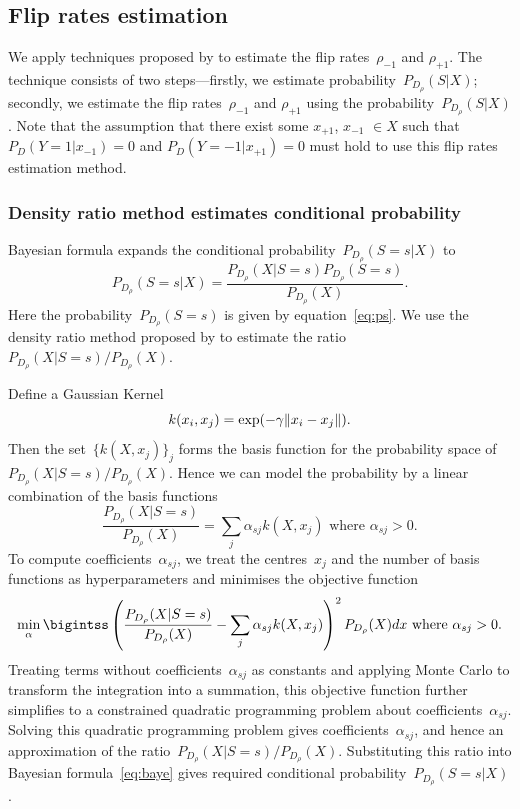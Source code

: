 \documentclass[12pt]{article} %
\DeclarePairedDelimiter{\norm}{\lVert}{\rVert}
\newcommand{\rhoo}{\rho_{+1}}
\newcommand{\rhoz}{\rho_{-1}}
\begin{document}
\subsection{Flip rates estimation}\label{method2}
We apply techniques proposed by \citet{liu2016classification} to estimate the flip rates~$\rhoz$ and $\rhoo$. The technique consists of two steps---firstly, we estimate probability~$P_{D_\rho}(S|X)$; secondly, we estimate the flip rates~$\rhoz$ and $\rhoo$ using the probability~$P_{D_\rho}(S|X)$. 
{\color{red} Note that the assumption that there exist some $x_{+1}$, $x_{-1}$ $\in X$ such that $P_{D}(Y=1|x_{-1})=0$ and $P_{D}(Y=-1|x_{+1})=0$ must hold to use this flip rates estimation method.}



\subsubsection{Density ratio method estimates conditional probability}\label{method22}
Bayesian formula expands the conditional probability~$P_{D_\rho}(S=s|X)$ to
\begin{equation}
   P_{D_\rho}(S=s|X)=\frac{P_{D_\rho}(X|S=s)P_{D_\rho}(S=s)}{P_{D_\rho}(X)}.\label{eq:baye}
\end{equation}
Here the probability~$P_{D_\rho}(S=s)$ is given by equation~\eqref{eq:ps}. We use the density ratio method proposed by \citet{DBLP:journals/jmlr/KanamoriHS09} to estimate the ratio~${P_{D_\rho}(X|S=s)}/{P_{D_\rho}(X)}$.

Define a Gaussian Kernel 
\begin{equation}\label{eq:gauss}
k(x_i,x_j)=\exp(-\gamma\norm{x_i-x_j}).
\end{equation} 
Then the set~$\{k(X,x_j) \}_j$ forms the basis function for the probability space of ${P_{D_\rho}(X|S=s)}/{P_{D_\rho}(X)}$. Hence we can model the probability by a linear combination of the basis functions
\begin{equation*}
   \frac{P_{D_\rho}(X|S=s)}{P_{D_\rho}(X)}=\sum_j \alpha_{sj} k(X,x_j) \text{ where }\alpha_{sj}>0.%
\end{equation*}
To compute coefficients~$\alpha_{sj}$, we treat the centres~$x_j$ and the number of basis functions as hyperparameters and minimises the objective function
\begin{equation*}
  \min_\alpha \bigintss \left(\frac{P_{D_\rho}(X|S=s)}{P_{D_\rho}(X)}-\sum_j \alpha_{sj} k(X,x_j)\right)^2P_{D_\rho}(X)dx \text{ where }\alpha_{sj}>0.
\end{equation*}
Treating terms without coefficients~$\alpha_{sj}$ as constants and applying Monte Carlo to transform the integration into a summation, this objective function further simplifies to a constrained quadratic programming problem about coefficients~$\alpha_{sj}$. Solving this quadratic programming problem gives coefficients~$\alpha_{sj}$, and hence an approximation of the ratio~${P_{D_\rho}(X|S=s)}/{P_{D_\rho}(X)}$. Substituting this ratio into Bayesian formula~\eqref{eq:baye} gives required conditional probability~$P_{D_\rho}(S=s|X)$.
\end{document}
